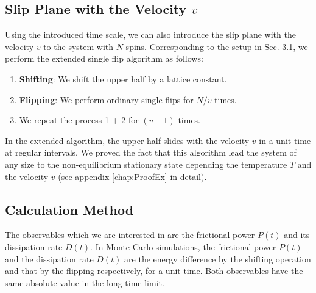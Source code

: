 \subsection{Slip Plane with the Velocity $v$}

Using the introduced time scale, we can also introduce the slip plane with the velocity $v$ to the system with $N$-spins. Corresponding to the setup in Sec. 3.1, we perform the extended single flip algorithm as follows:
\begin{enumerate}
	\item \textbf{Shifting}: We shift the upper half by a lattice constant.
	\item \textbf{Flipping}: We perform ordinary single flips for $N/v$ times.
	\item We repeat the process 1 + 2 for $(v-1)$ times.
\end{enumerate}
In the extended algorithm, the upper half slides with the velocity $v$ in a unit time at regular intervals. We proved the fact that this algorithm lead the system of any size to the non-equilibrium stationary state depending the temperature $T$ and the velocity $v$ (see appendix \ref{chap:ProofEx} in detail).

\subsection{Calculation Method}

The observables which we are interested in are the frictional power $P(t)$ and its dissipation rate $D(t)$. In Monte Carlo simulations, the frictional power $P(t)$ and the dissipation rate $D(t)$ are the energy difference by the shifting operation and that by the flipping respectively, for a unit time. Both observables have the same absolute value in the long time limit.

